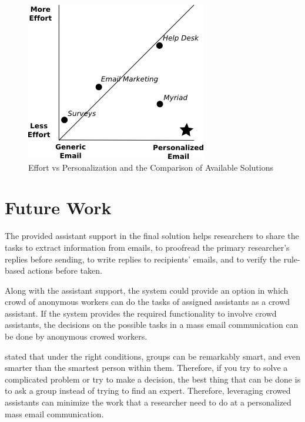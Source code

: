 \begin{figure}[htbp]
	\centering
	\includegraphics[width=.55\textwidth]{imgs/drawingEfforPersonalizationAnnotations.png}
	\caption[Effort vs Personalization and the Comparison of Available Solutions]{Effort vs Personalization and the Comparison of Available Solutions}
	\label{fig:drawingEfforPersonalizationAnnotations}
\end{figure}

\section{Future Work}
\label{sec:6.2:FutuWork}

The provided assistant support in the final solution helps researchers to share the tasks to extract information from emails, to proofread the primary researcher's replies before sending, to write replies to recipients' emails, and to verify the rule-based actions before taken.
\vspace{1cm}

Along with the assistant support, the system could provide an option in which crowd of anonymous workers can do the tasks of assigned assistants as a crowd assistant. If the system provides the required functionality to involve crowd assistants, the decisions on the possible tasks in a mass email communication can be done by anonymous crowed workers.
\vspace{1cm}

\cite{Surowiecki2005} stated that under the right conditions, groups can be remarkably smart, and even smarter than the smartest person within them. Therefore, if you try to solve a complicated problem or try to make a decision, the best thing that can be done
is to ask a group instead of trying to find an expert. Therefore, leveraging crowed assistants can minimize the work that a researcher need to do at a personalized mass email communication.
\vspace{1cm}

